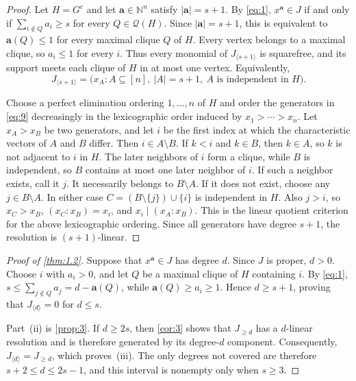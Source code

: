 \documentclass[11pt]{amsart}
\newtheorem{proposition}[theorem]{Proposition}
\theoremstyle{definition}
\newcommand{\NN}{\mathbb N}
\newcommand{\cQ}{\mathcal Q}
\begin{document}

\begin{proof}
Let $H=G^c$ and let $\mathbf a\in\NN^n$ satisfy $|\mathbf a|=s+1$. By \cref{eq:1}, $x^{\mathbf a}\in J$ if and only if $\sum_{i\notin Q}a_i\ge s$ for every $Q\in\cQ(H)$. Since $|\mathbf a|=s+1$, this is equivalent to $\mathbf a(Q)\le1$ for every maximal clique $Q$ of $H$. Every vertex belongs to a maximal clique, so $a_i\le1$ for every $i$. Thus every monomial of $J_{\langle s+1\rangle}$ is squarefree, and its support meets each clique of $H$ in at most one vertex. Equivalently,
\begin{equation}\label{eq:9}
J_{\langle s+1\rangle}
=
\bigl(x_A:A\subseteq[n],\ |A|=s+1,\ A\text{ is independent in }H\bigr).
\end{equation}

Choose a perfect elimination ordering $1,\ldots,n$ of $H$ and order the generators in \cref{eq:9} decreasingly in the lexicographic order induced by $x_1>\cdots>x_n$. Let $x_A>x_B$ be two generators, and let $i$ be the first index at which the characteristic vectors of $A$ and $B$ differ. Then $i\in A\setminus B$. If $k<i$ and $k\in B$, then $k\in A$, so $k$ is not adjacent to $i$ in $H$. The later neighbors of $i$ form a clique, while $B$ is independent, so $B$ contains at most one later neighbor of $i$. If such a neighbor exists, call it $j$. It necessarily belongs to $B\setminus A$. If it does not exist, choose any $j\in B\setminus A$. In either case $C=(B\setminus\{j\})\cup\{i\}$ is independent in $H$. Also $j>i$, so $x_C>x_B$, $(x_C:x_B)=x_i$, and $x_i\mid(x_A:x_B)$. This is the linear quotient criterion for the above lexicographic ordering. Since all generators have degree $s+1$, the resolution is $(s+1)$-linear.
\end{proof}

\begin{proof}[Proof of \cref{thm:1.2}]
Suppose that $x^{\mathbf a}\in J$ has degree $d$. Since $J$ is proper, $d>0$. Choose $i$ with $a_i>0$, and let $Q$ be a maximal clique of $H$ containing $i$. By \cref{eq:1}, $s\le \sum_{j\notin Q}a_j=d-\mathbf a(Q)$, while $\mathbf a(Q)\ge a_i\ge1$. Hence $d\ge s+1$, proving that $J_{\langle d\rangle}=0$ for $d\le s$.

Part~\textup{(ii)} is \cref{prop:3}. If $d\ge2s$, then \cref{cor:3} shows that $J_{\ge d}$ has a $d$-linear resolution and is therefore generated by its degree-$d$ component. Consequently, $J_{\langle d\rangle}=J_{\ge d}$, which proves~\textup{(iii)}. The only degrees not covered are therefore $s+2\le d\le2s-1$, and this interval is nonempty only when $s\ge3$.
\end{proof}
\end{document}
